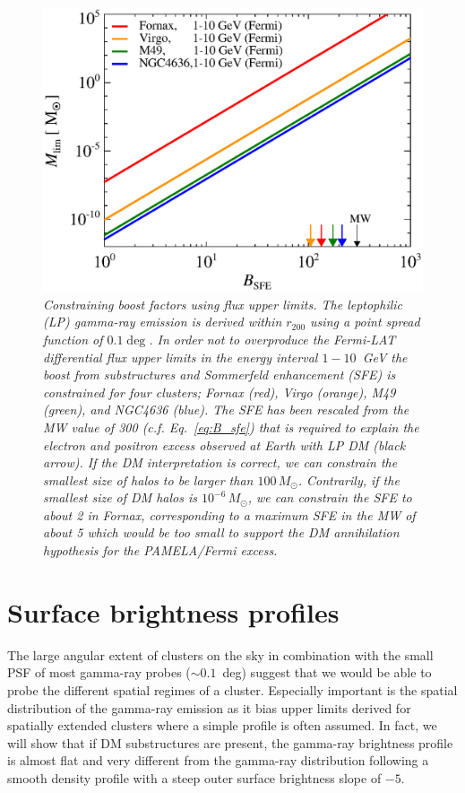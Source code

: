 \documentclass[10pt,aps,pra,reprint,amsmath,amsfonts,amssymb,showpacs,nofootinbib,floatfix]{revtex4-1}
\newcommand{\msun}{M_\odot}
\newcommand{\rvir}{r_{200}}
\begin{document}
\begin{figure}%
 \includegraphics[width=0.99\columnwidth]{figures/LP.const.diff.v12.0.1deg.1.6T.SubMass.SF300.IR2.noMW.woGal.eps}
 \caption{\it Constraining boost factors using flux upper limits. The
   leptophilic (LP) gamma-ray emission is derived within $\rvir$ using
   a point spread function of $0.1\deg$. In order not to overproduce
   the Fermi-LAT differential flux upper limits in the energy interval
   $1-10$~GeV the boost from substructures and Sommerfeld enhancement
   (SFE) is constrained for four clusters; Fornax (red), Virgo
   (orange), M49 (green), and NGC4636 (blue). The SFE has been
   rescaled from the MW value of 300 (c.f. Eq.~\ref{eq:B_sfe}) that is
   required to explain the electron and positron excess observed at
   Earth with LP DM (black arrow). If the DM interpretation is
   correct, we can constrain the smallest size of halos to be larger
   than $100\,\msun$. Contrarily, if the smallest size of DM halos is
   $10^{-6}\,\msun$, we can constrain the SFE to about 2 in Fornax,
   corresponding to a maximum SFE in the MW of about 5 which would be
   too small to support the DM annihilation hypothesis for the
   PAMELA/Fermi excess.}
 \label{fig:boost_const}
\end{figure}



\section{Surface brightness profiles}
\label{sect:spatial}

The large angular extent of clusters on the sky in combination with
the small PSF of most gamma-ray probes ($\sim 0.1$~deg) suggest that
we would be able to probe the different spatial regimes of a
cluster. Especially important is the spatial distribution of the
gamma-ray emission as it bias upper limits derived for spatially
extended clusters where a simple profile is often assumed. In fact, we
will show that if DM substructures are present, the gamma-ray
brightness profile is almost flat and very different from the
gamma-ray distribution following a smooth density profile with a steep
outer surface brightness slope of $-5$.
\end{document}
